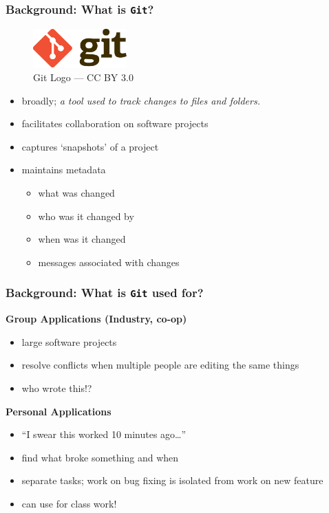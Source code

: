 \documentclass{beamer} \usetheme{Madrid}
\begin{document}
\begin{frame}
	\frametitle{Background: What is \texttt{Git}?}
	\vfill
	\begin{figure}
		\includegraphics[height=15mm]{logo.png}
		\caption{Git Logo --- CC BY 3.0}
	\end{figure}
	\vfill
	\begin{itemize}
		\item broadly; \emph{a tool used to track changes to files and folders.}
		\item facilitates collaboration on software projects
		\item captures `snapshots' of a project
		\item maintains metadata
		      \begin{itemize}
			      \item what was changed
			      \item who was it changed by
			      \item when was it changed
			      \item messages associated with changes
		      \end{itemize}
	\end{itemize}
	\vfill
\end{frame}

\begin{frame}
	\frametitle{Background: What is \texttt{Git} used for?}
	\vfill
	\centering \textbf{Group Applications (Industry, co-op)}
	\begin{itemize}
		\item large software projects
		\item resolve conflicts when multiple people are editing the same things
		\item who wrote this!?
	\end{itemize}
	\vfill
	\centering \textbf{Personal Applications}
	\begin{itemize}
		\item ``I swear this worked 10 minutes ago\ldots''
		\item find what broke something and when
		\item separate tasks; work on bug fixing is isolated from work on new feature
		\item can use for class work!
	\end{itemize}
	\vfill
\end{frame}
\end{document}
